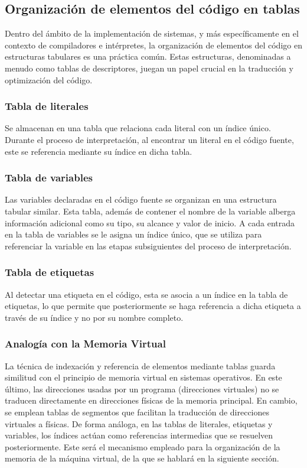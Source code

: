 \subsection{Organización de elementos del código en tablas}
Dentro del ámbito de la implementación de sistemas, y más específicamente en el contexto de compiladores e intérpretes, la organización de elementos del código en estructuras tabulares es una práctica común. Estas estructuras, denominadas a menudo como tablas de descriptores, juegan un papel crucial en la traducción y optimización del código.

\subsubsection{Tabla de literales}
Se almacenan en una tabla que relaciona cada literal con un índice único. Durante el proceso de interpretación, al encontrar un literal en el código fuente, este se referencia mediante su índice en dicha tabla.

\subsubsection{Tabla de variables}
Las variables declaradas en el código fuente se organizan en una estructura tabular similar. Esta tabla, además de contener el nombre de la variable alberga información adicional como su tipo, su alcance y valor de inicio. A cada entrada en la tabla de variables se le asigna un índice único, que se utiliza para referenciar la variable en las etapas subsiguientes del proceso de interpretación.

\subsubsection{Tabla de etiquetas}
Al detectar una etiqueta en el código, esta se asocia a un índice en la tabla de etiquetas, lo que permite que posteriormente se haga referencia a dicha etiqueta a través de su índice y no por su nombre completo.

\subsubsection{Analogía con la Memoria Virtual}
La técnica de indexación y referencia de elementos mediante tablas guarda similitud con el principio de memoria virtual en sistemas operativos. En este último, las direcciones usadas por un programa (direcciones virtuales) no se traducen directamente en direcciones físicas de la memoria principal. En cambio, se emplean tablas de segmentos que facilitan la traducción de direcciones virtuales a físicas. De forma análoga, en las tablas de literales, etiquetas y variables, los índices actúan como referencias intermedias que se resuelven posteriormente. Este será el mecanismo empleado para la organización de la memoria de la máquina virtual, de la que se hablará en la siguiente sección.

